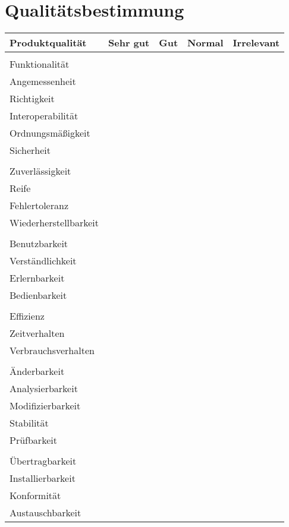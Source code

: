 \documentclass[pflichtenheft.tex]{subfiles}
\begin{document}
\chapter{Qualitätsbestimmung}

\begin{table}[H]
\begin{tabular}{ | l | p{2.5cm} | p{2.5cm} | p{2.5cm} | p{2.5cm} | }
    \hline
    \textbf{Produktqualität} & \textbf{Sehr gut} & \textbf{Gut} & \textbf{Normal} & 
    	\textbf{Irrelevant}\\ \hline
    &&&& \\
    \Large{Funktionalität}	&  &  &  &  \\    \hline
    Angemessenheit 			&  &  &  &  \\    \hline
    Richtigkeit    			&  &  &  &  \\    \hline
    Interoperabilität   	&  &  &  &  \\    \hline
    Ordnungsmäßigkeit		&  &  &  &  \\    \hline
    Sicherheit				&  &  &  &  \\    \hline
    &&&& \\
    \Large{Zuverlässigkeit} &  &  &  &  \\    \hline
    Reife					&  &  &  &  \\    \hline
    Fehlertoleranz			&  &  &  &  \\    \hline
    Wiederherstellbarkeit	&  &  &  &  \\    \hline
    &&&& \\
    \Large{Benutzbarkeit}	&  &  &  &  \\    \hline
    Verständlichkeit		&  &  &  &  \\    \hline
    Erlernbarkeit			&  &  &  &  \\    \hline
    Bedienbarkeit			&  &  &  &  \\    \hline
    &&&& \\
    \Large{Effizienz}		&  &  &  &  \\    \hline
    Zeitverhalten			&  &  &  &  \\    \hline
    Verbrauchsverhalten		&  &  &  &  \\    \hline
    &&&& \\
    \Large{Änderbarkeit}	&  &  &  &  \\    \hline
    Analysierbarkeit		&  &  &  &  \\    \hline
    Modifizierbarkeit		&  &  &  &  \\    \hline
    Stabilität				&  &  &  &  \\    \hline
    Prüfbarkeit				&  &  &  &  \\    \hline
    &&&& \\
    \Large{Übertragbarkeit}	&  &  &  &  \\    \hline
    Installierbarkeit		&  &  &  &  \\    \hline
    Konformität				&  &  &  &  \\    \hline
    Austauschbarkeit		&  &  &  &  \\    \hline
    
    
\end{tabular}
\end{table}
\end{document}
